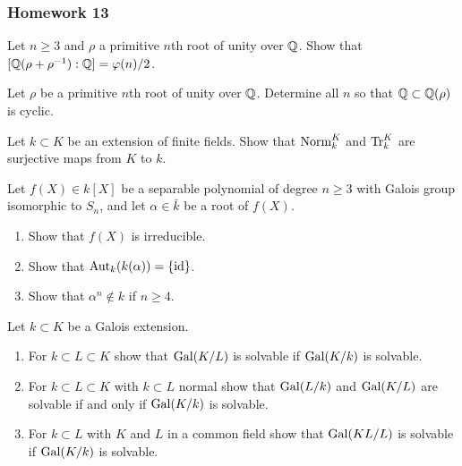 \subsubsection{Homework 13}
\setcounter{exercise}{0}
\setcounter{equation}{0}

\begin{problem}
Let $n\geq 3$ and $\rho$ a primitive $n$th root of unity over $\mathbb{Q}$. Show
that $[\mathbb{Q}(\rho+\rho^{-1}):\mathbb{Q}]=\varphi(n)/2$.
\end{problem}
\begin{solution}
\end{solution}

\begin{problem}
Let $\rho$ be a primitive $n$th root of unity over $\mathbb{Q}$. Determine all
$n$ so that $\mathbb{Q}\subset\mathbb{Q}(\rho)$ is cyclic.
\end{problem}
\begin{solution}
\end{solution}

\begin{problem}
  Let $k\subset K$ be an extension of finite fields. Show that
  $\operatorname{Norm}_k^K$ and $\operatorname{Tr}_k^K$ are surjective maps from $K$ to
  $k$.
\end{problem}
\begin{solution}
\end{solution}

\begin{problem}
  Let $f(X)\in k[X]$ be a separable polynomial of degree $n\geq 3$ with
  Galois group isomorphic to $S_n$, and let $\alpha\in\bar k$ be a root
  of $f(X)$.
  \begin{enumerate}[label=(\alph*),noitemsep]
  \item Show that $f(X)$ is irreducible.
  \item Show that $\operatorname{Aut}_k(k(\alpha))=\{\operatorname{id}\}$.
  \item Show that $\alpha^n\notin k$ if $n\geq 4$.
  \end{enumerate}
\end{problem}
\begin{solution}
\end{solution}

\begin{problem}
  Let $k\subset K$ be a Galois extension.
\begin{enumerate}[label=(\alph*),noitemsep]
\item For $k\subset L\subset K$ show that $\operatorname{Gal}(K/L)$ is
  solvable if $\operatorname{Gal}(K/k)$ is solvable.
\item For $k\subset L\subset K$ with $k\subset L$ normal show
  that $\operatorname{Gal}(L/k)$ and $\operatorname{Gal}(K/L)$ are solvable if and only if
  $\operatorname{Gal}(K/k)$ is solvable.
\item For $k\subset L$ with $K$ and $L$ in a common field show
  that $\operatorname{Gal}(KL/L)$ is solvable if $\operatorname{Gal}(K/k)$ is solvable.
\end{enumerate}
\end{problem}
\begin{solution}
\end{solution}

